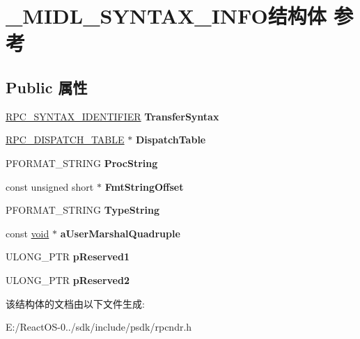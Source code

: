 \hypertarget{struct___m_i_d_l___s_y_n_t_a_x___i_n_f_o}{}\section{\+\_\+\+M\+I\+D\+L\+\_\+\+S\+Y\+N\+T\+A\+X\+\_\+\+I\+N\+F\+O结构体 参考}
\label{struct___m_i_d_l___s_y_n_t_a_x___i_n_f_o}
\subsection*{Public 属性}
\begin{DoxyCompactItemize}
\item 
\mbox{\label{struct___m_i_d_l___s_y_n_t_a_x___i_n_f_o_ab86d39fc5596f1dc8af880662b9b9906}} 
\hyperlink{struct___r_p_c___s_y_n_t_a_x___i_d_e_n_t_i_f_i_e_r}{R\+P\+C\+\_\+\+S\+Y\+N\+T\+A\+X\+\_\+\+I\+D\+E\+N\+T\+I\+F\+I\+ER} {\bfseries Transfer\+Syntax}
\item 
\mbox{\label{struct___m_i_d_l___s_y_n_t_a_x___i_n_f_o_aa62fe8edfd4df6a01d8b2d3ee7b8321b}} 
\hyperlink{struct_r_p_c___d_i_s_p_a_t_c_h___t_a_b_l_e}{R\+P\+C\+\_\+\+D\+I\+S\+P\+A\+T\+C\+H\+\_\+\+T\+A\+B\+LE} $\ast$ {\bfseries Dispatch\+Table}
\item 
\mbox{\label{struct___m_i_d_l___s_y_n_t_a_x___i_n_f_o_a4765b2279cbf7519f1c295cc288cea6f}} 
P\+F\+O\+R\+M\+A\+T\+\_\+\+S\+T\+R\+I\+NG {\bfseries Proc\+String}
\item 
\mbox{\label{struct___m_i_d_l___s_y_n_t_a_x___i_n_f_o_ace7d8d1321c38834cd011b0e10406119}} 
const unsigned short $\ast$ {\bfseries Fmt\+String\+Offset}
\item 
\mbox{\label{struct___m_i_d_l___s_y_n_t_a_x___i_n_f_o_a4db7aa9edc4901c2eced1a9cec34da9f}} 
P\+F\+O\+R\+M\+A\+T\+\_\+\+S\+T\+R\+I\+NG {\bfseries Type\+String}
\item 
\mbox{\label{struct___m_i_d_l___s_y_n_t_a_x___i_n_f_o_ab877b87821221f85eabd7f2d1426647d}} 
const \hyperlink{interfacevoid}{void} $\ast$ {\bfseries a\+User\+Marshal\+Quadruple}
\item 
\mbox{\label{struct___m_i_d_l___s_y_n_t_a_x___i_n_f_o_a9d5dfff378346c17cff2cf1092ff7db7}} 
U\+L\+O\+N\+G\+\_\+\+P\+TR {\bfseries p\+Reserved1}
\item 
\mbox{\label{struct___m_i_d_l___s_y_n_t_a_x___i_n_f_o_a1d1aeb001eea08fc402109576960b2db}} 
U\+L\+O\+N\+G\+\_\+\+P\+TR {\bfseries p\+Reserved2}
\end{DoxyCompactItemize}


该结构体的文档由以下文件生成\+:\begin{DoxyCompactItemize}
\item 
E\+:/\+React\+O\+S-\/0../sdk/include/psdk/rpcndr.\+h\end{DoxyCompactItemize}
